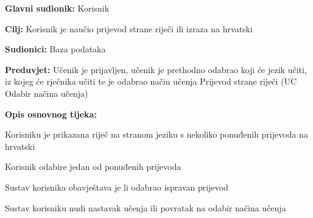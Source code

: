 					\noindent {}
					\begin{packed_item}

						\item \textbf{Glavni sudionik: } Korisnik
						\item \textbf{Cilj: } Korisnik je naučio prijevod strane riječi ili izraza na hrvatski
						\item \textbf{Sudionici: } Baza podataka
						\item \textbf{Preduvjet: } Učenik je prijavljen, učenik je prethodno odabrao koji će jezik učiti, iz kojeg će rječnika učiti te je odabrao način učenja Prijevod strane riječi (UC Odabir načina učenja)
						\item  \textbf{Opis osnovnog tijeka:}
						
						\item[] \begin{packed_enum}
							
							\item Korisniku je prikazana riječ na stranom jeziku s nekoliko ponuđenih prijevoda na hrvatski
							\item Korisnik odabire jedan od ponuđenih prijevoda
							\item Sustav korisnika obavještava je li odabrao ispravan prijevod
							\item Sustav korisniku nudi nastavak učenja ili povratak na odabir načina učenja

						\end{packed_enum}

					\end{packed_item}



